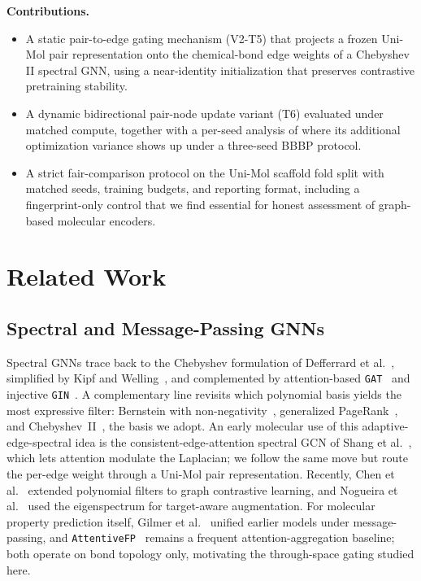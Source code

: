 \documentclass[conference]{IEEEtran}
\begin{document}
\noindent\textbf{Contributions.}
\begin{itemize}
  \item A static pair-to-edge gating mechanism (V2-T5) that projects a frozen Uni-Mol pair representation onto the chemical-bond edge weights of a Chebyshev II spectral GNN, using a near-identity initialization that preserves contrastive pretraining stability.
  \item A dynamic bidirectional pair-node update variant (T6) evaluated under matched compute, together with a per-seed analysis of where its additional optimization variance shows up under a three-seed BBBP protocol.
  \item A strict fair-comparison protocol on the Uni-Mol scaffold fold split with matched seeds, training budgets, and reporting format, including a fingerprint-only control that we find essential for honest assessment of graph-based molecular encoders.
\end{itemize}

\section{Related Work}
\label{sec:related}

\subsection{Spectral and Message-Passing GNNs}
Spectral GNNs trace back to the Chebyshev formulation of Defferrard et al.~\cite{defferrard2016chebnet}, simplified by Kipf and Welling~\cite{kipf2017gcn}, and complemented by attention-based \texttt{GAT}~\cite{velickovic2018gat} and injective \texttt{GIN}~\cite{xu2019gin}. A complementary line revisits which polynomial basis yields the most expressive filter: Bernstein with non-negativity~\cite{he2021bernnet}, generalized PageRank~\cite{chien2021gprgnn}, and Chebyshev~II~\cite{he2022chebnetii}, the basis we adopt. An early molecular use of this adaptive-edge-spectral idea is the consistent-edge-attention spectral GCN of Shang et al.~\cite{shang2021eagcn}, which lets attention modulate the Laplacian; we follow the same move but route the per-edge weight through a Uni-Mol pair representation. Recently, Chen et al.~\cite{chen2024polygcl} extended polynomial filters to graph contrastive learning, and Nogueira et al.~\cite{nogueira2025spectra} used the eigenspectrum for target-aware augmentation. For molecular property prediction itself, Gilmer et al.~\cite{gilmer2017mpnn} unified earlier models under message-passing, and \texttt{AttentiveFP}~\cite{xiong2020attentivefp} remains a frequent attention-aggregation baseline; both operate on bond topology only, motivating the through-space gating studied here.
\end{document}
